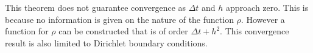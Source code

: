 This theorem does not guarantee convergence as $\Delta t$ and $h$ approach zero. This is because no information is given on the nature of the function $\rho$. However a function for $\rho$ can be constructed that is of order $\Delta t + h^2$.
This convergence result is also limited to Dirichlet boundary conditions. 



